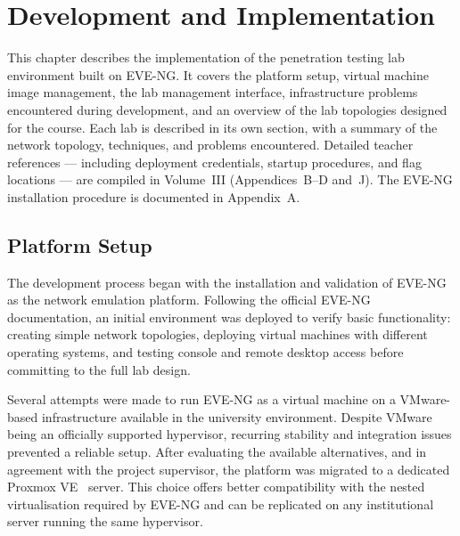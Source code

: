 
\chapter{Development and Implementation}
\label{ch:development}

This chapter describes the implementation of the penetration testing lab environment
built on EVE-NG. It covers the platform setup, virtual machine image management,
the lab management interface, infrastructure problems encountered during development,
and an overview of the lab topologies designed for the course. Each lab is described
in its own section, with a summary of the network topology, techniques, and problems
encountered. Detailed teacher references ---
including deployment credentials, startup procedures, and flag locations --- are
compiled in Volume~III (Appendices~B--D and~J). The EVE-NG installation
procedure is documented in Appendix~A.


\section{Platform Setup}

The development process began with the installation and validation of EVE-NG~\cite{eve_ng} as the
network emulation platform. Following the official EVE-NG documentation, an initial
environment was deployed to verify basic functionality: creating simple
network topologies, deploying virtual machines with different operating systems, and
testing console and remote desktop access before committing to the full lab design.

Several attempts were made to run EVE-NG as a virtual machine on a VMware-based
infrastructure available in the university environment. Despite VMware being
an officially supported hypervisor, recurring stability and integration issues
prevented a reliable setup. After evaluating the available alternatives, and in
agreement with the project supervisor, the platform was migrated to a dedicated
Proxmox VE~\cite{proxmox} server. This choice offers better compatibility with the nested
virtualisation required by EVE-NG and can be replicated on any institutional server
running the same hypervisor.

